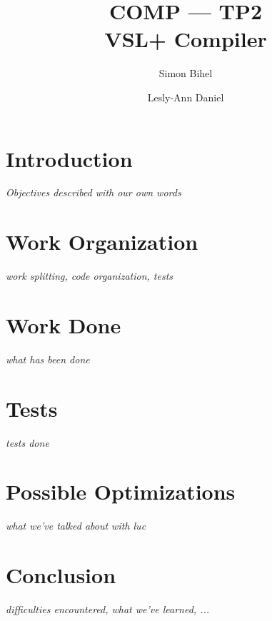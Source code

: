 \documentclass[a4paper,11pt,english]{article}
\title{COMP --- TP2\\VSL+ Compiler}
\author{Simon Bihel \and Lesly-Ann Daniel}
\begin{document}
\maketitle

\section{Introduction}
\textit{Objectives described with our own words}

\section{Work Organization}
\textit{work splitting, code organization, tests}

\section{Work Done}
\textit{what has been done}

\section{Tests}
\textit{tests done}

\section{Possible Optimizations}
\textit{what we've talked about with luc}

\section{Conclusion}
\textit{difficulties encountered, what we've learned, ...}
\end{document}
